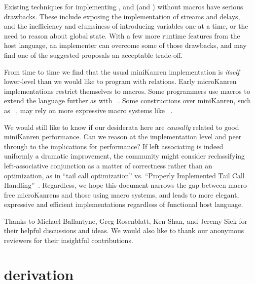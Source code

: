 \documentclass[sigplan,balance=true,pbalance=true,natbib=false]{acmart}
\begin{document}
Existing techniques for
implementing , 
and  (and ) without macros have
serious drawbacks. These include exposing the implementation of
streams and delays, and the inefficiency and clumsiness of introducing
variables one at a time, or the need to reason about global state. With
a few more runtime features from the host language, an implementer can
overcome some of those drawbacks, and may find one of the suggested
proposals an acceptable trade-off.

From time to time we find that the usual miniKanren implementation is
\emph{itself} lower-level than we would like to program with
relations. Early microKanren implementations restrict themselves
to  macros. Some programmers use macros to
extend the language further as
with ~\cite{keep2009pattern}. Some constructions
over miniKanren, such
as ~\cite{ballantyne2020macros}, may rely on
more expressive macro systems
like ~\cite{culpepper2012fortifying}.

We would still like to know if our desiderata here are \emph{causally}
related to good miniKanren performance. Can we reason at the
implementation level and peer through to the implications for
performance? If left associating  is indeed uniformly
a dramatic improvement, the community might consider reclassifying
left-associative conjunction as a matter of correctness rather than an
optimization, as in \enquote{tail call optimization} vs.
\enquote{Properly Implemented Tail Call
  Handling}~\cite{felleisen2014requestions}. Regardless, we hope this
document narrows the gap between macro-free microKanrens and those
using macro systems, and leads to more elegant, expressive and
efficient implementations regardless of functional host language.

\begin{acks}

  Thanks to Michael Ballantyne, Greg Rosenblatt, Ken Shan, and Jeremy
  Siek for their helpful discussions and ideas. We would also like to
  thank our anonymous reviewers for their insightful contributions.

\end{acks}

\printbibliography{}

\appendix

\section{ derivation}\label{sec:conda-derivation}
\end{document}
